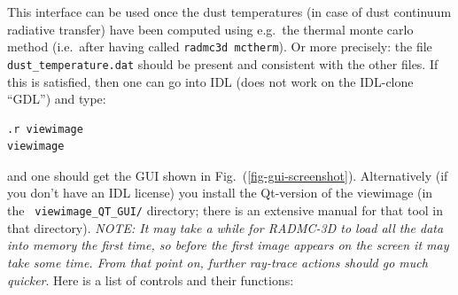 \documentclass{report}
\newenvironment{asciibox}%
  {\begin{list}{}{%
    \setlength{\topsep}{0.5em}%
    \setlength{\parskip}{0em}%
    \setlength{\parsep}{0em}%
    \setlength{\itemsep}{0em}%
    \setlength{\rightmargin}{0em}%
    \setlength{\leftmargin}{3.0em}%
    \setlength{\labelsep}{1em}%
    \setlength{\labelwidth}{2em}%
  }\normalfont\footnotesize\item}
  {\end{list}}
\begin{document}
This interface can be used once the dust temperatures (in case of dust
continuum radiative transfer) have been computed using e.g.\ the thermal
monte carlo method (i.e.\ after having called {\small\tt radmc3d mctherm}).
Or more precisely: the file {\small\tt dust\_temperature.dat} should be
present and consistent with the other files. If this is satisfied, then one
can go into IDL (does not work on the IDL-clone ``GDL'') and type:
\begin{asciibox}\begin{verbatim}
.r viewimage
viewimage
\end{verbatim}\end{asciibox}
and one should get the GUI shown in
Fig.~(\ref{fig-gui-screenshot}). Alternatively (if you don't have an IDL
license) you install the Qt-version of the viewimage (in the {\small\tt
  viewimage\_QT\_GUI/} directory; there is an extensive manual for that tool
in that directory). {\em NOTE: It may take a while for RADMC-3D to load all
  the data into memory the first time, so before the first image appears on
  the screen it may take some time.  From that point on, further ray-trace
  actions should go much quicker}.  Here is a list of controls and their
functions:
\end{document}
